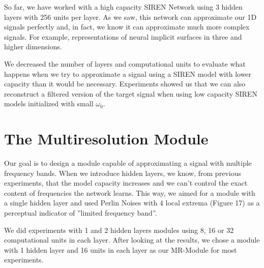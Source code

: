 {So far, we have worked with a high capacity SIREN Network using 3 hidden layers with 256 units per layer. As we saw, this network can approximate our 1D signals perfectly and, in fact, we know it can approximate much more complex signals. For example, representations of neural implicit surfaces in three and higher dimensions.

We decreased the number of layers and computational units to evaluate what happens when we try to approximate a signal using a SIREN model with lower capacity than it would be necessary. Experiments showed us that we can also reconstruct a filtered version of the target signal when using low capacity SIREN models initialized with small $\omega_0$.


\section{The Multiresolution Module}

Our goal is to design a module capable of approximating a signal with multiple frequency bands. When we introduce hidden layers, we know, from previous experiments, that the model capacity increases and we can’t control the exact content of frequencies the network learns. This way, we aimed for a module with a single hidden layer and used Perlin Noises with 4 local extrema (Figure 17) as a perceptual indicator of ”limited frequency band”.

We did experiments with 1 and 2 hidden layers modules using 8, 16 or 32 computational units in each layer. After looking at the results, we chose a module with 1 hidden layer and 16 units in each layer as our MR-Module for most experiments.

}
